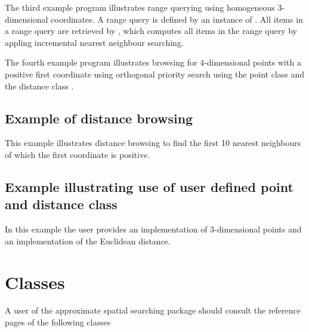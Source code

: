 The third example program illustrates range querying using homogeneous 3-dimensional coordinates. 
A range query is defined by an instance of . 
All items in a range query are retrieved by 
, which computes all items in
the range query by appling incremental nearest neighbour searching. 


The fourth example program illustrates browsing for $4$-dimensional points with
a positive first coordinate using orthogonal priority search
using the point class 
and the distance class .
 
\subsection{Example of distance browsing}


This example illustrates distance browsing to find the first 10 nearest neighbours of which
the first coordinate is positive. 

\subsection{Example illustrating use of user defined point and distance class}

In this example the user provides an implementation of 3-dimensional points and an
implementation of the Euclidean distance.


\section{Classes}

A user of the approximate spatial searching package should consult the reference
pages of the following classes

